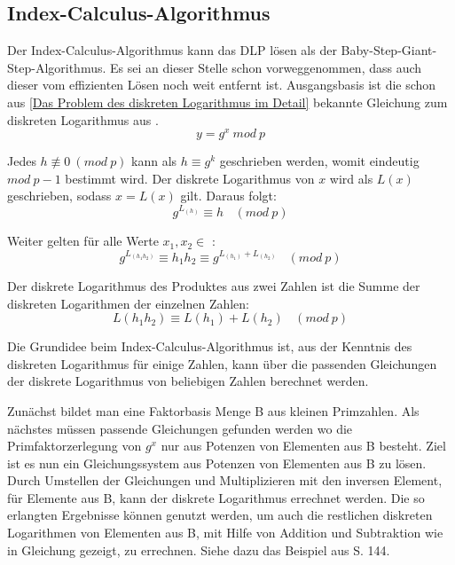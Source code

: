	\subsection{Index-Calculus-Algorithmus}
		Der Index-Calculus-Algorithmus kann das DLP  lösen als der Baby-Step-Giant-Step-Algorithmus. Es sei an dieser Stelle schon vorweggenommen, dass auch dieser vom effizienten Lösen noch weit entfernt ist. Ausgangsbasis ist die schon aus \ref{Das Problem des diskreten Logarithmus im Detail} bekannte Gleichung  zum diskreten Logarithmus aus \myZPStern.
		\begin{equation}
			y = g^x~mod~p
			\label{Gleichung Diskreten Logarithmus aus ZPStern}
		\end{equation}
		
		Jedes $h \not\equiv 0~(mod~p)$ kann als $h \equiv g^k$ geschrieben werden, womit eindeutig $mod~p - 1$ bestimmt wird. Der diskrete Logarithmus von $x$ wird als $L(x)$ geschrieben, sodass $x = L(x)$ gilt. Daraus folgt:
		\begin{equation}
			g^{L_{(h)}} \equiv h~~~~(mod~p)
			\label{Gleichung Diskreten Logarithmus äquivalent}
		\end{equation}
		
		Weiter gelten für alle Werte $x_1, x_2 \in$ \myZPStern:
		\begin{equation}
			g^{L_{(h_1 h_2)}} \equiv h_1 h_2 \equiv g^{L_{(h_1)} + L_{(h_2)}}~~~~(mod~p)
		\end{equation}
		
		Der diskrete Logarithmus des Produktes aus zwei Zahlen ist die Summe der diskreten Logarithmen der einzelnen Zahlen:
		\begin{equation}
			L(h_1 h_2) \equiv L(h_1) + L(h_2)~~~~(mod~p)
			\label{Gleichung Diskreten Logarithmus additionSubtraktion}
		\end{equation}
		
		Die Grundidee beim Index-Calculus-Algorithmus ist, aus der Kenntnis des diskreten Logarithmus für einige Zahlen, kann über die passenden Gleichungen der diskrete Logarithmus von beliebigen Zahlen berechnet werden.\cite{DLP:ECDLP:Probleme:und:Loesungen}
		
		Zunächst bildet man eine Faktorbasis Menge B aus kleinen Primzahlen. Als nächstes müssen passende Gleichungen gefunden werden wo die Primfaktorzerlegung von $g^x$ nur aus Potenzen von Elementen aus B besteht. Ziel ist es nun ein Gleichungssystem aus Potenzen von Elementen aus B zu lösen. Durch Umstellen der Gleichungen und Multiplizieren mit den inversen Element, für Elemente aus B, kann der diskrete Logarithmus errechnet werden. Die so erlangten Ergebnisse können genutzt werden, um auch die restlichen diskreten Logarithmen von Elementen aus B, mit Hilfe von Addition und Subtraktion wie in Gleichung  gezeigt, zu errechnen. Siehe dazu das Beispiel aus \cite{Elliptic:Curves:Number:Theory:and:Cryptography} S. 144.
		
